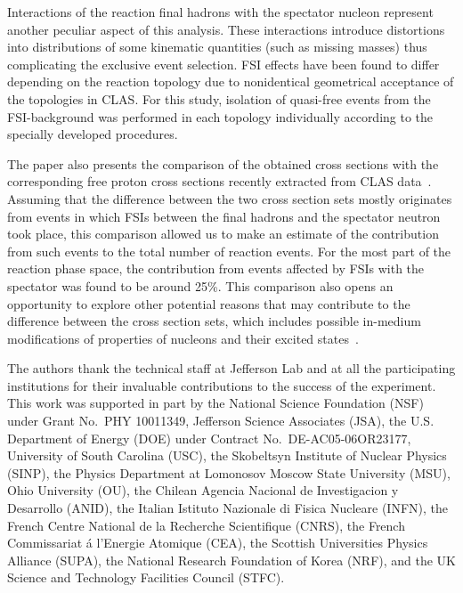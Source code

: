 \documentclass[prc,twocolumn,superscriptaddress,showpacs,amssymb,amsmath,amsfonts,aps,nofootinbib]{revtex4-1}
\begin{document}
Interactions of the reaction final hadrons with the spectator nucleon represent another peculiar aspect of this analysis. These interactions introduce distortions into distributions of some kinematic quantities (such as missing masses) thus complicating the exclusive event selection. FSI effects have been found to differ depending on the reaction topology due to nonidentical geometrical acceptance of the topologies in CLAS. For this study, isolation of quasi-free events from the FSI-background was performed in each topology individually according to the specially developed procedures.



The paper also presents the comparison of the obtained cross sections with the corresponding free proton cross sections recently extracted from CLAS data~\cite{Fed_an_note:2017,Fed_paper_2018}. Assuming that the difference between the two cross section sets mostly originates from events in which FSIs between the final hadrons and the spectator neutron took place, this comparison allowed us to make an estimate of the contribution from such events to the total number of reaction events. For the most part of the reaction phase space, the contribution from events affected by FSIs with the spectator was found to be around 25\%. This comparison also opens an opportunity to explore other potential reasons that may contribute to the difference between the cross section sets, which includes possible in-medium modifications of properties of nucleons and their excited states~\cite{Mokeev:1995fy,Bianchi:1994ax,Ahrens:1986hn,Krusche:2004xz,Noble:1980my}.



\vspace{2em}

\begin{acknowledgments}
The authors thank the technical staff at Jefferson Lab and at all the participating institutions for their invaluable contributions to the success of the experiment.
This work was supported in part by the National Science Foundation (NSF) under Grant No.~PHY 10011349, Jefferson Science Associates (JSA), the U.S. Department of Energy (DOE) under Contract No.~DE-AC05-06OR23177, University of South Carolina (USC), the Skobeltsyn Institute of Nuclear Physics (SINP), the Physics Department at Lomonosov Moscow State University (MSU), Ohio University (OU), the Chilean Agencia Nacional de Investigacion y Desarrollo (ANID), the Italian Istituto Nazionale di Fisica Nucleare (INFN), the French Centre National de la Recherche Scientifique (CNRS), the French Commissariat \'a l'Energie Atomique (CEA), the Scottish Universities Physics Alliance (SUPA), the National Research Foundation of Korea (NRF), and the UK Science and Technology Facilities Council (STFC). 


\end{acknowledgments}


{}

\end{document}
